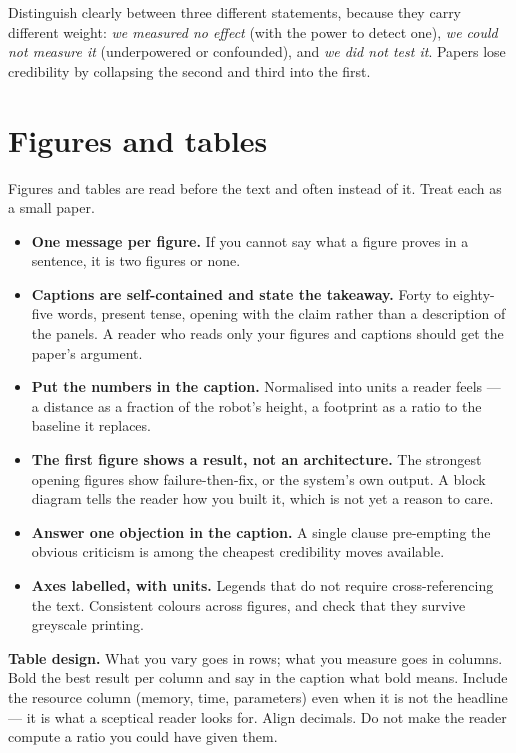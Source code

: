 \documentclass[11pt,a4paper]{article}
\newcommand{\lead}[1]{\medskip\noindent\textbf{#1}\quad}
\begin{document}
Distinguish clearly between three different statements, because they carry
different weight: \emph{we measured no effect} (with the power to detect one),
\emph{we could not measure it} (underpowered or confounded), and \emph{we did
not test it}. Papers lose credibility by collapsing the second and third into
the first.

\section{Figures and tables}

Figures and tables are read before the text and often instead of it. Treat
each as a small paper.

\begin{itemize}
  \item \textbf{One message per figure.} If you cannot say what a figure
    proves in a sentence, it is two figures or none.
  \item \textbf{Captions are self-contained and state the takeaway.} Forty to
    eighty-five words, present tense, opening with the claim rather than a
    description of the panels. A reader who reads only your figures and
    captions should get the paper's argument.
  \item \textbf{Put the numbers in the caption.} Normalised into units a
    reader feels --- a distance as a fraction of the robot's height, a
    footprint as a ratio to the baseline it replaces.
  \item \textbf{The first figure shows a result, not an architecture.} The
    strongest opening figures show failure-then-fix, or the system's own
    output. A block diagram tells the reader how you built it, which is not
    yet a reason to care.
  \item \textbf{Answer one objection in the caption.} A single clause
    pre-empting the obvious criticism is among the cheapest credibility moves
    available.
  \item \textbf{Axes labelled, with units.} Legends that do not require
    cross-referencing the text. Consistent colours across figures, and check
    that they survive greyscale printing.
\end{itemize}

\lead{Table design.} What you vary goes in rows; what you measure goes in
columns. Bold the best result per column and say in the caption what bold
means. Include the resource column (memory, time, parameters) even when it is
not the headline --- it is what a sceptical reader looks for. Align decimals.
Do not make the reader compute a ratio you could have given them.
\end{document}
